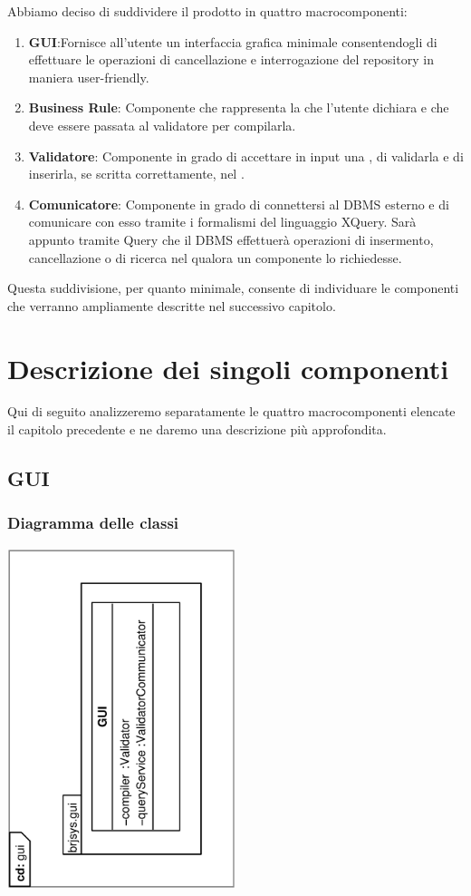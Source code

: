 \documentclass[11pt,titlepage,a4paper]{report}
\begin{document}
Abbiamo deciso di suddividere il prodotto in quattro macrocomponenti:
\begin{enumerate}
 \item \textbf{GUI}:Fornisce all'utente un interfaccia grafica minimale consentendogli di effettuare le operazioni di cancellazione e interrogazione del repository in maniera user-friendly.
\item \textbf{Business Rule}: Componente che rappresenta la \br che l'utente dichiara e che deve essere passata al validatore per compilarla.
\item \textbf{Validatore}: Componente in grado di accettare in input una \br, di validarla e di inserirla, se scritta correttamente, nel \re.
\item \textbf{Comunicatore}: Componente in grado di connettersi al DBMS esterno e di comunicare con esso tramite i formalismi del linguaggio XQuery.
Sar\`a appunto tramite Query che il DBMS effettuer\`a operazioni di insermento, cancellazione o di ricerca nel \re qualora un componente lo richiedesse.
\end{enumerate}
Questa suddivisione, per quanto minimale, consente di individuare le componenti che verranno ampliamente descritte nel successivo capitolo.

\chapter{Descrizione dei singoli componenti}
Qui di seguito analizzeremo separatamente le quattro macrocomponenti elencate il capitolo precedente e ne daremo una descrizione pi\`u approfondita.

\section{GUI}
\subsection{Diagramma delle classi}
\begin{center}
\includegraphics[width=0.5\textwidth, angle=-90]{DiagrammaClassi/gui.eps}
\end{center}
\end{document}

